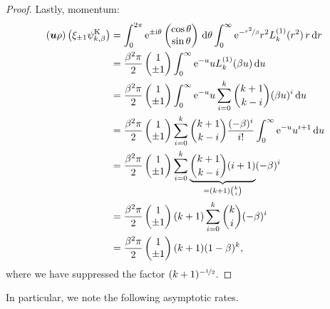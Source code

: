 \begin{proof}
Lastly, momentum:
\begin{align*}
({\bm u}\rho)\left(\xi_{\pm1}\psi^{\mathrm{K}}_{k,\beta}\right)
&= \int_0^{2\pi} \mathrm{e}^{\pm\mathrm{i}\theta} \begin{pmatrix} \cos\theta \\ \sin\theta \end{pmatrix} \,\mathrm{d}\theta
   \int_0^\infty \mathrm{e}^{-\nicefrac{r^2}{\beta}} r^2 L_k^{(1)}(r^2) \, r \,\mathrm{d} r \\
&= \frac{\beta^2\pi}{2}\begin{pmatrix}1\\\pm1\end{pmatrix}
   \int_0^\infty \mathrm{e}^{-u} u L_k^{(1)}(\beta u) \,\mathrm{d} u \\
&= \frac{\beta^2\pi}{2}\begin{pmatrix}1\\\pm1\end{pmatrix} 
   \int_0^\infty \mathrm{e}^{-u} u \sum_{i=0}^k \binom{k+1}{k-i} (\beta u)^i \,\mathrm{d} u \\
&= \frac{\beta^2\pi}{2}\begin{pmatrix}1\\\pm1\end{pmatrix}
   \sum_{i=0}^k \binom{k+1}{k-i} \frac{(-\beta)^i}{i!} \int_0^\infty \mathrm{e}^{-u} u^{i+1} \,\mathrm{d} u \\
&= \frac{\beta^2\pi}{2}\begin{pmatrix}1\\\pm1\end{pmatrix}
   \sum_{i=0}^k \underbrace{\binom{k+1}{k-i}(i+1)}_{=(k+1)\binom{k}{i}} (-\beta)^i \\
&= \frac{\beta^2\pi}{2}\begin{pmatrix}1\\\pm1\end{pmatrix} (k+1) \sum_{i=0}^k \binom{k}{i} (-\beta)^i \\
&= \frac{\beta^2\pi}{2}\begin{pmatrix}1\\\pm1\end{pmatrix} (k+1)(1-\beta)^k,
\end{align*}
where we have suppressed the factor $(k+1)^{-\nicefrac{1}{2}}$.
\end{proof}
In particular, we note the following asymptotic rates.
